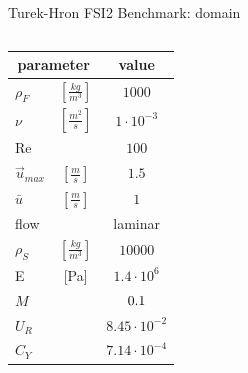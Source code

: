 \documentclass[10pt,t]{beamer}
\begin{document}
\begin{frame}{Turek-Hron FSI2 Benchmark: domain}
\begin{columns}
		\vspace{0.5cm}
		\begin{tabular}{ l c  | c } 
			\multicolumn{2}{c|}{parameter} & value  \\ 
			\hline
			$\rho_F$ & $\left[\frac{kg}{m^3}\right]$ & \cellcolor{blue!20} $1000$   \\
			$\nu$& $\left[\frac{m^2}{s}\right]$ & \cellcolor{blue!20} $1 \cdot 10^{-3}$  \\
			Re &  & \cellcolor{blue!20} $100$ \\
			$\vec{u}_{max}$ & $\left[\frac{m}{s}\right]$ & \cellcolor{blue!20} $1.5$ \\
			$\bar{u}$ & $\left[\frac{m}{s}\right]$ & \cellcolor{blue!20} $1$ \\
			flow & & \cellcolor{blue!20} laminar \\
			\hline
			$\rho_S$ & $\left[\frac{kg}{m^3}\right]$ & \cellcolor{orange!50} $10000$    \\
			E & [\si{Pa}] & \cellcolor{orange!50} $1.4\cdot 10^6$    \\
			\hline
			$M$ & & $ \cellcolor{green!10} 0.1$     \\
			\hline
			$U_R$ & & $ 8.45\cdot 10^{-2}$  \\
			$C_Y$ & & $  7.14 \cdot 10^{-4}$  \\			

		\end{tabular}
\end{columns}


    
\end{frame}
\end{document}
